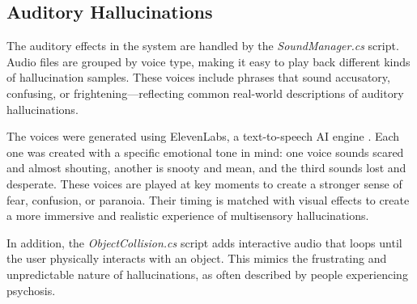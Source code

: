 \begin{landscape}
\begin{center}
{
    }
    \end{center}
    \end{landscape}
    

    \subsection{Auditory Hallucinations}

    The auditory effects in the system are handled by the \textit{SoundManager.cs} script. Audio files are grouped by voice type, making it easy to play back different kinds of hallucination samples. These voices include phrases that sound accusatory, confusing, or frightening—reflecting common real-world descriptions of auditory hallucinations.
    
    The voices were generated using ElevenLabs, a text-to-speech AI engine \cite{elevenlabs}. Each one was created with a specific emotional tone in mind: one voice sounds scared and almost shouting, another is snooty and mean, and the third sounds lost and desperate. These voices are played at key moments to create a stronger sense of fear, confusion, or paranoia. Their timing is matched with visual effects to create a more immersive and realistic experience of multisensory hallucinations.
    
    In addition, the \textit{ObjectCollision.cs} script adds interactive audio that loops until the user physically interacts with an object. This mimics the frustrating and unpredictable nature of hallucinations, as often described by people experiencing psychosis.
    
